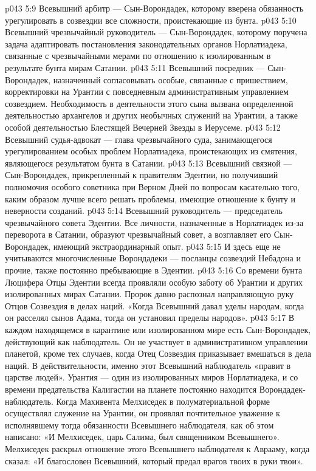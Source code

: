 \vs p043 5:9 \bibnobreakspace Всевышний арбитр --- Сын\hyp{}Ворондадек, которому вверена обязанность урегулировать в созвездии все сложности, проистекающие из бунта.
\vs p043 5:10 \bibnobreakspace Всевышний чрезвычайный руководитель --- Сын\hyp{}Ворондадек, которому поручена задача адаптировать постановления законодательных органов Норлатиадека, связанные с чрезвычайными мерами по отношению к изолированным в результате бунта мирам Сатании.
\vs p043 5:11 \bibnobreakspace Всевышний посредник --- Сын\hyp{}Ворондадек, назначенный согласовывать особые, связанные с пришествием, корректировки на Урантии с повседневным административным управлением созвездием. Необходимость в деятельности этого сына вызвана определенной деятельностью архангелов и других необычных служений на Урантии, а также особой деятельностью Блестящей Вечерней Звезды в Иерусеме.
\vs p043 5:12 \bibnobreakspace Всевышний судья\hyp{}адвокат --- глава чрезвычайного суда, занимающегося урегулированием особых проблем Норлатиадека, проистекающих из смятения, являющегося результатом бунта в Сатании.
\vs p043 5:13 \bibnobreakspace Всевышний связной --- Сын\hyp{}Ворондадек, прикрепленный к правителям Эдентии, но получивший полномочия особого советника при Верном Дней по вопросам касательно того, каким образом лучше всего решать проблемы, имеющие отношение к бунту и неверности созданий.
\vs p043 5:14 \bibnobreakspace Всевышний руководитель --- председатель чрезвычайного совета Эдентии. Все личности, назначенные в Норлатиадек из\hyp{}за переворота в Сатании, образуют чрезвычайный совет, а возглавляет его Сын\hyp{}Ворондадек, имеющий экстраординарный опыт.
\vs p043 5:15 И здесь еще не учитываются многочисленные Ворондадеки --- посланцы созвездий Небадона и прочие, также постоянно пребывающие в Эдентии.
\vs p043 5:16 \pc Со времени бунта Люцифера Отцы Эдентии всегда проявляли особую заботу об Урантии и других изолированных мирах Сатании. Пророк давно распознал направляющую руку Отцов Созвездия в делах наций. «Когда Всевышний давал уделы народам, когда он расселял сынов Адама, тогда он установил пределы народов».
\vs p043 5:17 В каждом находящемся в карантине или изолированном мире есть Сын\hyp{}Ворондадек, действующий как наблюдатель. Он не участвует в административном управлении планетой, кроме тех случаев, когда Отец Созвездия приказывает вмешаться в дела наций. В действительности, именно этот Всевышний наблюдатель «правит в царстве людей». Урантия --- один из изолированных миров Норлатиадека, и со времени предательства Калигастии на планете постоянно находится Ворондадек\hyp{}наблюдатель. Когда Махивента Мелхиседек в полуматериальной форме осуществлял служение на Урантии, он проявлял почтительное уважение к исполнявшему тогда обязанности Всевышнего наблюдателя, как об этом написано: «И Мелхиседек, царь Салима, был священником Всевышнего». Мелхиседек раскрыл отношение этого Всевышнего наблюдателя к Аврааму, когда сказал: «И благословен Всевышний, который предал врагов твоих в руки твои».
